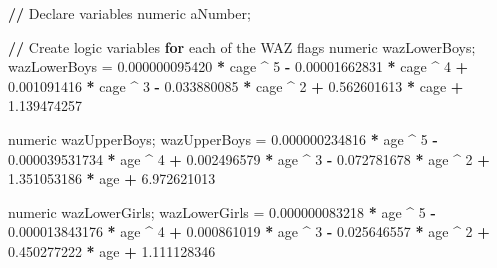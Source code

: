 \documentclass[12pt,a4paper]{article}
\newenvironment{Shaded}{\begin{snugshade}}{\end{snugshade}}
\newcommand{\DecValTok}[1]{\textcolor[rgb]{0.00,0.00,0.81}{#1}}
\newcommand{\FloatTok}[1]{\textcolor[rgb]{0.00,0.00,0.81}{#1}}
\newcommand{\StringTok}[1]{\textcolor[rgb]{0.31,0.60,0.02}{#1}}
\newcommand{\ControlFlowTok}[1]{\textcolor[rgb]{0.13,0.29,0.53}{\textbf{#1}}}
\newcommand{\OperatorTok}[1]{\textcolor[rgb]{0.81,0.36,0.00}{\textbf{#1}}}
\newcommand{\ErrorTok}[1]{\textcolor[rgb]{0.64,0.00,0.00}{\textbf{#1}}}
\newcommand{\NormalTok}[1]{#1}
\theoremstyle{definition}
\theoremstyle{definition}
\theoremstyle{definition}
\theoremstyle{remark}
\begin{document}
\begin{Shaded}
\begin{Highlighting}[]
\OperatorTok{/}\ErrorTok{/}\StringTok{ }\NormalTok{Declare variables}
\NormalTok{numeric aNumber;}

\OperatorTok{/}\ErrorTok{/}\StringTok{ }\NormalTok{Create logic variables }\ControlFlowTok{for}\NormalTok{ each of the WAZ flags}
\NormalTok{numeric wazLowerBoys;}
\NormalTok{wazLowerBoys =}\StringTok{ }\FloatTok{0.000000095420} \OperatorTok{*}\StringTok{ }\NormalTok{cage }\OperatorTok{^}\StringTok{ }\DecValTok{5} \OperatorTok{-}\StringTok{ }\FloatTok{0.00001662831} \OperatorTok{*}\StringTok{ }\NormalTok{cage }\OperatorTok{^}\StringTok{ }\DecValTok{4} 
               \OperatorTok{+}\StringTok{ }\FloatTok{0.001091416} \OperatorTok{*}\StringTok{ }\NormalTok{cage }\OperatorTok{^}\StringTok{ }\DecValTok{3} \OperatorTok{-}\StringTok{ }\FloatTok{0.033880085} \OperatorTok{*}\StringTok{ }\NormalTok{cage }\OperatorTok{^}\StringTok{ }\DecValTok{2} 
               \OperatorTok{+}\StringTok{ }\FloatTok{0.562601613} \OperatorTok{*}\StringTok{ }\NormalTok{cage }\OperatorTok{+}\StringTok{ }\FloatTok{1.139474257}

\NormalTok{numeric wazUpperBoys;}
\NormalTok{wazUpperBoys =}\StringTok{ }\FloatTok{0.000000234816} \OperatorTok{*}\StringTok{ }\NormalTok{age }\OperatorTok{^}\StringTok{ }\DecValTok{5} \OperatorTok{-}\StringTok{ }\FloatTok{0.000039531734} \OperatorTok{*}\StringTok{ }\NormalTok{age }\OperatorTok{^}\StringTok{ }\DecValTok{4}
               \OperatorTok{+}\StringTok{ }\FloatTok{0.002496579} \OperatorTok{*}\StringTok{ }\NormalTok{age }\OperatorTok{^}\StringTok{ }\DecValTok{3} \OperatorTok{-}\StringTok{ }\FloatTok{0.072781678} \OperatorTok{*}\StringTok{ }\NormalTok{age }\OperatorTok{^}\StringTok{ }\DecValTok{2}
               \OperatorTok{+}\StringTok{ }\FloatTok{1.351053186} \OperatorTok{*}\StringTok{ }\NormalTok{age }\OperatorTok{+}\StringTok{ }\FloatTok{6.972621013}

\NormalTok{numeric wazLowerGirls;}
\NormalTok{wazLowerGirls =}\StringTok{ }\FloatTok{0.000000083218} \OperatorTok{*}\StringTok{ }\NormalTok{age }\OperatorTok{^}\StringTok{ }\DecValTok{5} \OperatorTok{-}\StringTok{ }\FloatTok{0.000013843176} \OperatorTok{*}\StringTok{ }\NormalTok{age }\OperatorTok{^}\StringTok{ }\DecValTok{4}
                \OperatorTok{+}\StringTok{ }\FloatTok{0.000861019} \OperatorTok{*}\StringTok{ }\NormalTok{age }\OperatorTok{^}\StringTok{ }\DecValTok{3} \OperatorTok{-}\StringTok{ }\FloatTok{0.025646557} \OperatorTok{*}\StringTok{ }\NormalTok{age }\OperatorTok{^}\StringTok{ }\DecValTok{2}
                \OperatorTok{+}\StringTok{ }\FloatTok{0.450277222} \OperatorTok{*}\StringTok{ }\NormalTok{age }\OperatorTok{+}\StringTok{ }\FloatTok{1.111128346}


\end{Highlighting}
\end{Shaded}
\end{document}
